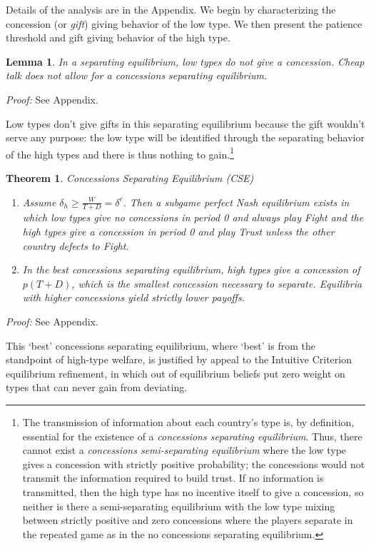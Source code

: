 \documentclass[12pt, letterpaper]{article}
\newcommand{\de}{\delta}
\newtheorem{theorem}{Theorem}
\newtheorem{lemma}{Lemma}
\begin{document}
Details of the analysis are in the Appendix. We begin by characterizing the concession (or \emph{gift}) giving behavior of the low type. We then present the patience threshold and gift giving behavior of the high type.

\begin{lemma}
	In a separating equilibrium, low types do not give a concession. Cheap talk does not allow for a concessions separating equilibrium.
	\label{lemma:3}
\end{lemma}
\emph{Proof:} See Appendix.

Low types don't give gifts in this separating equilibrium because the gift wouldn't serve any purpose: the low type will be identified through the separating behavior of the high types and there is thus nothing to gain.\footnote{The transmission of information about each country's type is, by definition, essential for the existence of a \emph{concessions separating equilibrium}. Thus, there cannot exist a \emph{concessions semi-separating equilibrium} where the low type gives a concession with strictly positive probability; the concessions would not transmit the information required to build trust. If no information is transmitted, then the high type has no incentive itself to give a concession, so neither is there a semi-separating equilibrium with the low type mixing between strictly positive and zero concessions where the players separate in the repeated game as in the no concessions separating equilibrium.}

\begin{theorem}
\emph{Concessions Separating Equilibrium (CSE)}
	\begin{enumerate}
		\item[(a)] Assume $\delta_h \geq \frac{W}{T+D} = \de^{c}$. Then a subgame perfect Nash equilibrium exists in which low types give no concessions in period 0 and always play Fight and the high types give a concession in period 0 and play Trust unless the other country defects to Fight.
		\item[(b)] In the best concessions separating equilibrium, high types give a concession of $p(T + D)$, which is the smallest concession necessary to separate. Equilibria with higher concessions yield strictly lower payoffs.
\end{enumerate}
	\label{theorem:2}
\end{theorem}
\emph{Proof:} See Appendix.

This `best' concessions separating equilibrium, where `best' is from the standpoint of high-type welfare, is justified by appeal to the Intuitive Criterion equilibrium refinement, in which out of equilibrium beliefs put zero weight on types that can never gain from deviating.
\end{document}
